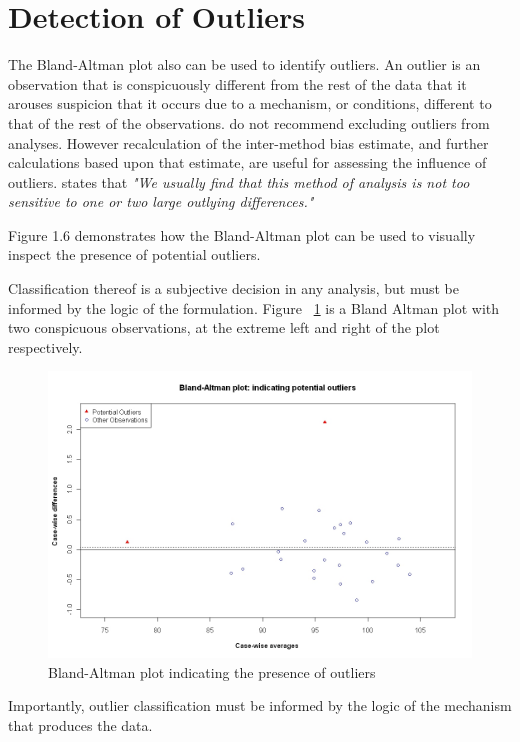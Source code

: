 \documentclass[12pt, a4paper]{report}
\theoremstyle{plain}
\theoremstyle{definition}
\theoremstyle{remark}
\begin{document}
\section{Detection of Outliers}
The Bland-Altman plot also can be used to identify outliers. An outlier is an observation that is conspicuously different from the rest of the data that it arouses suspicion that it occurs due to a mechanism, or conditions, different to that of the rest of the observations. \citet*{BA99} do not recommend excluding outliers from analyses. However recalculation of the inter-method bias estimate, and further calculations based upon that estimate, are useful for assessing the influence of outliers. \citet{BA99} states that \emph{"We usually find that this method of analysis is not too sensitive to one or two large outlying differences."}
	
 Figure 1.6 demonstrates how the Bland-Altman plot can be used to visually inspect the presence of potential outliers.

Classification thereof is a subjective decision in any analysis, but must be informed by the logic of the formulation. Figure ~\ref{BAOutliers} is a Bland Altman plot with two
	conspicuous observations, at the extreme left and right of the
	plot respectively.
	
	
	\begin{figure}[h!]
		\begin{center}
			\includegraphics[width=125mm]{images/BAOutliers.jpeg}
			\caption{Bland-Altman plot indicating the presence of outliers}\label{BAOutliers}
		\end{center}
	\end{figure}
Importantly, outlier classification must be informed by the logic of the mechanism that produces the data. 
\end{document}
